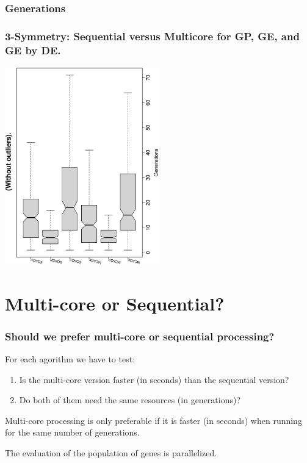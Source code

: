 \documentclass[18pt,c]{beamer}
\makeatletter
\let\beamer@writeslidentry@miniframeson=\beamer@writeslidentry
\newcommand*{\miniframeson}{\let\beamer@writeslidentry=\beamer@writeslidentry@miniframeson}
\makeatother
\begin{document}
 \begin{frame}
 \fontsize{8pt}{9pt}\selectfont
 \frametitle{ Generations }

 \label{ExpAStatsTable002.tex}  
 \end{frame}

 \begin{frame}
 \frametitle{ 3-Symmetry: Sequential versus Multicore for GP, GE, and GE by DE.  }
 \begin{center}
\includegraphics[width=0.5\textwidth, angle=-90]
{ExpAboxplottGenerations001.eps}
 \end{center}
 \label{ExpAboxplottGenerations001.eps}  
 \end{frame}

\miniframeson
\section{Multi-core or Sequential?}
\begin{frame}
\frametitle{
Should we prefer multi-core or sequential processing?
}
For each agorithm we have to test:
\begin{enumerate}
\item Is the multi-core version faster (in seconds) than the sequential version?
 
\item Do both of them need the same resources (in generations)?
\end{enumerate}
Multi-core processing is only preferable if it is faster (in seconds)
when running for the same number of generations.
 
The evaluation of the population of genes is parallelized.
\end{frame}%
\miniframeson
\end{document}
